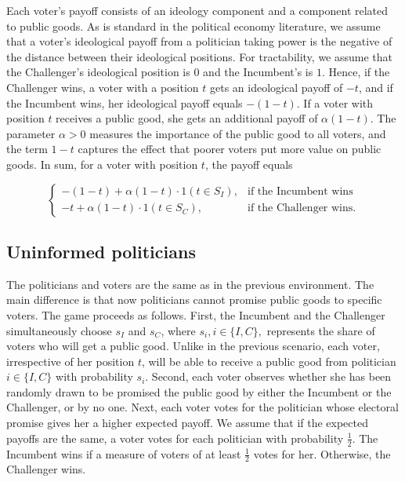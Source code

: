\documentclass[12pt,english]{article}
\begin{document}
Each voter's payoff consists of an ideology component and a component related to public goods. As is standard in the political economy literature, we assume that a voter's ideological payoff from a politician taking power is the negative of the distance between their ideological positions. For tractability, we assume that the Challenger's ideological position is $0$ and the Incumbent's is $1$. Hence, if the Challenger wins, a voter with a position $t$ gets an ideological payoff of $-t$, and if the Incumbent wins, her ideological payoff equals $-(1-t)$. If a voter with position $t$ receives a public good, she gets an additional payoff of $\alpha (1-t)$. The parameter $\alpha > 0$ measures the importance of the public good to all voters, and the term $1 - t$ captures the effect that poorer voters put more value on public goods. In sum, for a voter with position $t$, the payoff equals

\begin{equation}
\label{voter_payoff_informed}
\begin{cases}
		-(1-t) + \alpha (1 - t) \cdot 1(t \in S_I), & \text{if the Incumbent wins}\\
         -t + \alpha (1 - t) \cdot 1(t \in S_C) , & \text{if the Challenger wins.}
		 \end{cases}
\end{equation}




\subsection{Uninformed politicians} \label{sect-uninfo-pol}

The politicians and voters are the same as in the previous environment. The main difference is that now politicians cannot promise public goods to specific voters. The game proceeds as follows. First, the Incumbent and the Challenger simultaneously choose $s_I$ and $s_C$, where $s_i, i \in \{I,C\},$ represents the share of voters who will get a public good. Unlike in the previous scenario, each voter, irrespective of her position $t$, will be able to receive a public good from politician $i \in \{I,C\}$ with probability $s_i$. Second, each voter observes whether she has been randomly drawn to be promised the public good by either the Incumbent or the Challenger, or by no one.  Next, each voter votes for the politician whose electoral promise gives her a higher expected payoff. We assume that if the expected payoffs are the same, a voter votes for each politician with probability $\frac{1}{2}$. The Incumbent wins if a measure of voters of at least $\frac{1}{2}$ votes for her. Otherwise, the Challenger wins. 
\end{document}
